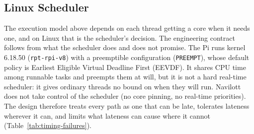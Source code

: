 \subsection{Linux Scheduler}\label{sec:linux_scheduler}
The execution model above depends on each thread getting a core when it needs
one, and on Linux that is the scheduler's decision. The engineering contract
follows from what the scheduler does and does not promise. The Pi runs kernel
6.18.50 (\texttt{rpt-rpi-v8}) with a preemptible configuration
(\texttt{PREEMPT}), whose default policy is Earliest Eligible Virtual Deadline
First (EEVDF). It shares CPU time among runnable tasks and preempts them at
will, but it is not a hard real-time scheduler: it gives ordinary threads no
bound on when they will run. Navilott does not take control of the scheduler
(no core pinning, no real-time priorities). The design therefore treats every
path as one that can be late, tolerates lateness wherever it can, and limits
what lateness can cause where it cannot (Table~\ref{tab:timing-failures}).

